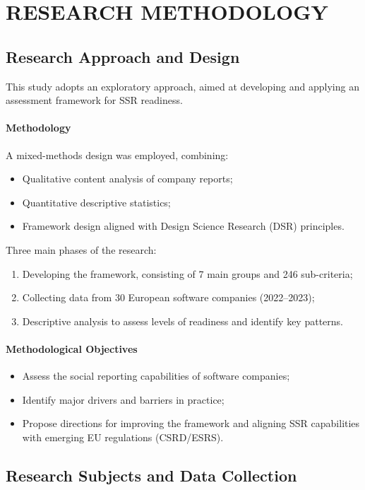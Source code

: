 \chapter{RESEARCH METHODOLOGY}

\section{Research Approach and Design}
This study adopts an exploratory approach, aimed at developing and applying an assessment framework for SSR readiness.

\subsubsection{Methodology}
A mixed-methods design was employed, combining:
\begin{itemize}
    \item Qualitative content analysis of company reports;
    \item Quantitative descriptive statistics;
    \item Framework design aligned with Design Science Research (DSR) principles.
\end{itemize}

Three main phases of the research:
\begin{enumerate}
    \item Developing the framework, consisting of 7 main groups and 246 sub-criteria;
    \item Collecting data from 30 European software companies (2022--2023);
    \item Descriptive analysis to assess levels of readiness and identify key patterns.
\end{enumerate}

\subsubsection{Methodological Objectives}
\begin{itemize}
    \item Assess the social reporting capabilities of software companies;
    \item Identify major drivers and barriers in practice;
    \item Propose directions for improving the framework and aligning SSR capabilities with emerging EU regulations (CSRD/ESRS).
\end{itemize}

\section{Research Subjects and Data Collection}

